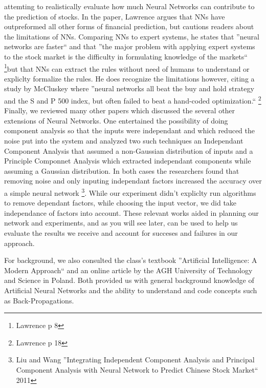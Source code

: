 \documentclass[a4paper,11pt]{article}
\begin{document}
attemting to realistically evaluate how much Neural Networks can contribute to the prediction of stocks. In
the paper, Lawrence argues that NNs have outpreformed all other forms of financial prediction, but cautions
readers about the limitations of NNs. Comparing NNs to expert systems, he states that ''neural networks are
faster`` and that ''the major problem with applying expert systems to the stock market is the difficulty in
formulating knowledge of the markets`` \footnote{Lawrence p 8}but that NNs can extract the rules without need of humans to
understand or expliclty formalize the rules. He does recognize the limitations however, citing a study by
McCluskey where ''neural networks all beat the buy and hold strategy and the S and P 500 index, but often
failed to beat a hand-coded optimization.`` \footnote{Lawrence p 18}
Finally, we reviewed many other papers which discussed the several other extensions of Neural Networks. One entertained the possibility of doing component analysis so that the inputs were independant and which reduced the noise put into the system and analyzed two such techniques an Independant Component Analysis that assumed a non-Gaussian distribution of inputs and a Principle Componnet Analysis which extracted independant components while assuming a Gaussian distribution. In both cases the researchers found that removing noise and only inputing independant factors increased the accuracy over a simple neural network \footnote{Liu and Wang ''Integrating Independent Component Analysis and Principal Component Analysis with Neural Network to Predict Chinese Stock Market`` 2011}. While our experiment didn't expliclty run algorithms to remove dependant factors, while choosing the input vector, we did take independance of factors into account. 
These relevant works aided in planning our network and experiments, and as you will see later, can be used to help us evaluate the results we receive and account for succeses and failures in our approach.

For background, we also consulted the class's textbook ''Artificial Intelligence: A Modern Approach`` and an online article by the AGH University of Technology and Science in Poland. Both provided us with general background knowledge of Artificial Neural Networks and the ability to understand and code concepts such as Back-Propagations. 
\end{document}

